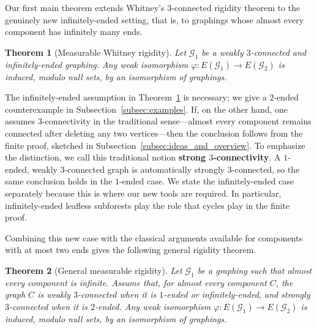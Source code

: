 \documentclass{article}
\theoremstyle{plain}
\newtheorem{thm}{Theorem}[section]
\theoremstyle{definition}
\newcommand{\cG}{\mathcal{G}}
\newcommand{\fg}{\varphi}
\begin{document}
Our first main theorem extends Whitney's $3$-connected rigidity theorem to the genuinely new infinitely-ended setting, that is, to graphings whose almost every component has infinitely many ends.

\begin{thm}[Measurable Whitney rigidity]\label{thm:graph_isom}
    Let $\cG_1$ be a weakly $3$-connected and infinitely-ended graphing. Any weak isomorphism $\fg:E(\cG_1)\to E(\cG_2)$ is induced, modulo null sets, by an isomorphism of graphings.
\end{thm}

The infinitely-ended assumption in Theorem~\ref{thm:graph_isom} is necessary; we give a $2$-ended counterexample in Subsection~\ref{subsec:examples}. If, on the other hand, one assumes $3$-connectivity in the traditional sense---almost every component remains connected after deleting any two vertices---then the conclusion follows from the finite proof, sketched in Subsection~\ref{subsec:ideas_and_overview}. To emphasize the distinction, we call this traditional notion \textbf{strong $3$-connectivity}. A $1$-ended, weakly $3$-connected graph is automatically strongly $3$-connected, so the same conclusion holds in the $1$-ended case. We state the infinitely-ended case separately because this is where our new tools are required. In particular, infinitely-ended leafless subforests play the role that cycles play in the finite proof.

Combining this new case with the classical arguments available for components with at most two ends gives the following general rigidity theorem.

\begin{thm}[General measurable rigidity]\label{thm:graph_isom_general}
    Let $\cG_1$ be a graphing such that almost every component is infinite. Assume that, for almost every component $C$, the graph $C$ is weakly $3$-connected when it is $1$-ended or infinitely-ended, and strongly $3$-connected when it is $2$-ended. Any weak isomorphism $\fg:E(\cG_1)\to E(\cG_2)$ is induced, modulo null sets, by an isomorphism of graphings.
\end{thm}
\end{document}
